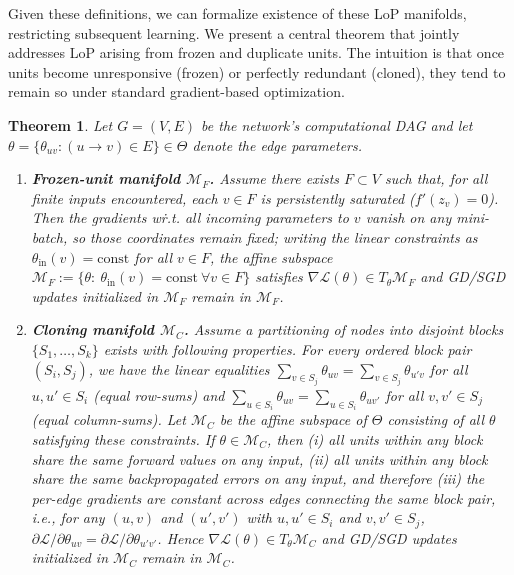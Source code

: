 \documentclass{article}
\newtheorem{theorem}{Theorem}[section]
\numberwithin{figure}{section}
\begin{document}
Given these definitions, we can formalize existence of these LoP manifolds, restricting subsequent learning. We present a central theorem that jointly addresses LoP arising from frozen and duplicate units.
The intuition is that once units become unresponsive (frozen) or perfectly redundant (cloned), they tend to remain so under standard gradient-based optimization. 
\begin{theorem}
\label{prop:frozen_duplicate_lop}
Let $G=(V,E)$ be the network’s computational DAG and let $\theta=\{\theta_{uv}:(u\to v)\in E\}\in\Theta$ denote the edge parameters.
\vspace*{-3pt}
\begin{enumerate}
\item \textbf{Frozen-unit manifold $\mathcal{M}_F$.}
Assume there exists $F\subset V$ such that, for all finite inputs encountered, each $v\in F$ is persistently saturated ($f'(z_v)=0$). Then the gradients w\.r.t. all incoming parameters to $v$ vanish on any mini-batch, so those coordinates remain fixed; writing the linear constraints as $\theta_{\mathrm{in}}(v)=\mathrm{const}$ for all $v\in F$, the affine subspace $\mathcal{M}_F:=\{\theta:\ \theta_{\mathrm{in}}(v)=\mathrm{const}\ \forall v\in F\}$ satisfies $\nabla\mathcal{L}(\theta)\in T_\theta\mathcal{M}_F$ and GD/SGD updates initialized in $\mathcal{M}_F$ remain in $\mathcal{M}_F$.
\vspace*{-2pt}
\item \textbf{Cloning manifold $\mathcal{M}_C$.}
Assume a partitioning of nodes into disjoint blocks $\{S_1,\dots,S_k\}$ exists with following properties. For every ordered block pair $(S_i,S_j)$, we have the linear equalities $\sum_{v\in S_j}\theta_{uv}=\sum_{v\in S_j}\theta_{u'v}$ for all $u,u'\in S_i$ (equal row-sums) and $\sum_{u\in S_i}\theta_{uv}=\sum_{u\in S_i}\theta_{uv'}$ for all $v,v'\in S_j$ (equal column-sums). Let $\mathcal{M}_C$ be the affine subspace of $\Theta$ consisting of all $\theta$ satisfying these constraints. If $\theta\in\mathcal{M}_C$, then (i) all units within any block share the same forward values on any input, (ii) all units within any block share the same backpropagated errors on any input, and therefore (iii) the per-edge gradients are constant across edges connecting the same block pair, i.e., for any $(u,v)$ and $(u',v')$ with $u,u'\in S_i$ and $v,v'\in S_j$, $\partial \mathcal{L}/\partial \theta_{uv}=\partial \mathcal{L}/\partial \theta_{u'v'}$. Hence $\nabla\mathcal{L}(\theta)\in T_\theta\mathcal{M}_C$ and GD/SGD updates initialized in $\mathcal{M}_C$ remain in $\mathcal{M}_C$.
\end{enumerate}
\end{theorem}
\end{document}
